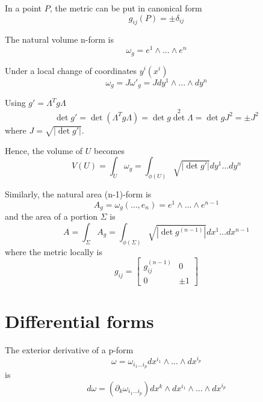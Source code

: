     In a point $P$, the metric can be put in canonical form 
    \begin{equation*}
        g_{ij} (P) = \pm \delta_{ij}
    \end{equation*}

    The natural volume n-form is 
    \begin{equation*}
        \omega_g = e^1 \wedge \ldots \wedge e^n
    \end{equation*}
    
    Under a local change of coordinates $y^i(x^i)$ 
    \begin{equation*}
        \omega_g = J {\omega'}_g = J dy^1 \wedge \ldots \wedge dy^n
    \end{equation*}

    Using $g' = \Lambda^T g \Lambda$
    \begin{equation*}
        \det g' = \det (\Lambda^T g \Lambda) = \det g \det^2 \Lambda = \det g J^2 = \pm J^2
    \end{equation*}
    where $J = \sqrt{|\det g'|}$.

    Hence, the volume of $U$ becomes 
    \begin{equation*}
        V(U) = \int_U \omega_g = \int_{\phi(U)} \sqrt{|\det g'|} dy^1 \ldots dy^n
    \end{equation*}

    Similarly, the natural area (n-1)-form is 
    \begin{equation*}
        A_g = \omega_g (\ldots, e_n) = e^1 \wedge \ldots \wedge e^{n-1}
    \end{equation*}
    and the area of a portion $\Sigma$ is 
    \begin{equation*}
        A = \int_{\Sigma} A_g = \int_{\phi(\Sigma)} \sqrt{|\det g^{(n-1)}|} dx^1 \ldots dx^{n-1}
    \end{equation*}
    where the metric locally is 
    \begin{equation*}
        g_{ij} = \begin{bmatrix}
            g_{ij}^{(n-1)} & 0 \\
            0 & \pm 1
        \end{bmatrix}
    \end{equation*}

\section{Differential forms}

    The exterior derivative of a p-form 
    \begin{equation*}
        \omega = \omega_{i_1 \ldots i_p} dx^{i_1} \wedge \ldots \wedge dx^{i_p}
    \end{equation*}
    is 
    \begin{equation*}
        d \omega = (\partial_k \omega_{i_1 \ldots i_p}) dx^k \wedge dx^{i_1} \wedge \ldots \wedge dx^{i_p}
    \end{equation*}

